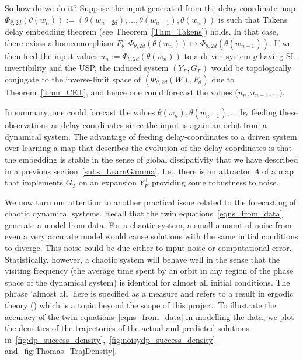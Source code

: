 So how do we do it? Suppose the input generated from the delay-coordinate map $\Phi_{\theta,2d}(\theta(w_{n})) := (\theta(w_{n-2d}),\ldots,\theta(w_{n-1}),\theta(w_{n}))$ is such that Takens delay embedding theorem (see Theorem~\ref{Thm_Takens}) holds.
In that case, there exists a homeomorphism  $F_\theta: \Phi_{\theta,2d}(\theta(w_{n})) \mapsto \Phi_{\theta,2d}(\theta(w_{n+1}))$. If we then feed the input values $u_n := \Phi_{\theta,2d}(\theta(w_{n}))$ to a driven system $g$ having SI-invertibility and the USP, the induced system $(Y_F,G_F)$ would be topologically conjugate to the inverse-limit space of
$(\Phi_{\theta,2d}(W), F_\theta)$ due to Theorem~\ref{Thm_CET}, and hence one could forecast the values ($u_n,u_{n+1},\ldots$). 

In summary, one could forecast  the values $\theta(w_n), \theta(w_{n+1}),\ldots$ by feeding these observations as delay coordinates since the input is again an orbit from a dynamical system. 
The advantage of feeding delay-coordinates to a driven system over learning a map that describes the evolution of the delay coordinates is that the embedding is stable in the sense of global dissipativity that we have described in a previous section~\ref{subs_LearnGamma}.
I.e., there is an attractor $A$ of a map that implements $G_T$ on an expansion $Y_F^+$ providing some robustness to noise. 

We now turn our attention to another practical issue related to the forecasting of chaotic dynamical systems.  
Recall that the twin equations~\ref{eqns_from_data} generate a model from data. 
For a chaotic system, a small amount of noise from even a very accurate model would cause solutions with the same initial conditions to diverge. This noise could be due either to input-noise or computational error.
Statistically, however,  a chaotic system will behave well in the sense that the visiting frequency (the average time spent by an orbit in any region of the phase space of the dynamical system) is identical for almost all initial conditions. 
The phrase `almost all' here is specified as a measure and refers to a result in ergodic theory (\cite{walters2000introduction}) which is a topic beyond the scope of this project.
To illustrate the accuracy of the twin  equations~\ref{eqns_from_data} in modelling the data, we plot the densities of the trajectories of the actual and predicted solutions in~\ref{fig:dp_success_density},~\ref{fig:noisydp_success_density} and~\ref{fig:Thomas_TrajDensity}.

